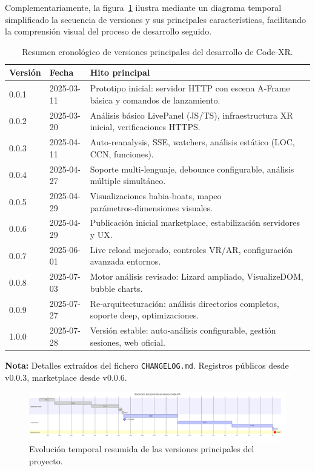 \documentclass[a4paper, 12pt]{book}
\begin{document}
Complementariamente, la figura~\ref{fig:timeline-versions} ilustra mediante un diagrama temporal simplificado la secuencia de versiones y sus principales características, facilitando la comprensión visual del proceso de desarrollo seguido.
\begin{table}[!htbp]
\centering\footnotesize
\begin{tabular}{p{1.8cm} p{2.2cm} p{10.5cm}}
\hline
\textbf{Versión} & \textbf{Fecha} & \textbf{Hito principal} \\
\hline
0.0.1 & 2025-03-11 & Prototipo inicial: servidor HTTP con escena A‑Frame básica y comandos de lanzamiento. \\
0.0.2 & 2025-03-20 & Análisis básico LivePanel (JS/TS), infraestructura XR inicial, verificaciones HTTPS. \\
0.0.3 & 2025-04-11 & Auto‑reanalysis, SSE, watchers, análisis estático (LOC, CCN, funciones). \\
0.0.4 & 2025-04-27 & Soporte multi‑lenguaje, debounce configurable, análisis múltiple simultáneo. \\
0.0.5 & 2025-04-29 & Visualizaciones babia‑boats, mapeo parámetros‑dimensiones visuales. \\
0.0.6 & 2025-04-29 & Publicación inicial marketplace, estabilización servidores y UX. \\
0.0.7 & 2025-06-01 & Live reload mejorado, controles VR/AR, configuración avanzada entornos. \\
0.0.8 & 2025-07-03 & Motor análisis revisado: Lizard ampliado, VisualizeDOM, bubble charts. \\
0.0.9 & 2025-07-27 & Re‑arquitecturación: análisis directorios completos, soporte deep, optimizaciones. \\
1.0.0 & 2025-07-28 & Versión estable: auto‑análisis configurable, gestión sesiones, web oficial. \\
\hline
\end{tabular}
\caption{Resumen cronológico de versiones principales del desarrollo de Code-XR.}
\label{tab:changelog}
\end{table}


\noindent \textbf{Nota:} Detalles extraídos del fichero \texttt{CHANGELOG.md}. Registros públicos desde v0.0.3, marketplace desde v0.0.6.


\begin{figure}[H]
  \centering
  \includegraphics[width=\textwidth]{img/versions_gantt.png}
  \caption{Evolución temporal resumida de las versiones principales del proyecto.}
  \label{fig:timeline-versions}
\end{figure}
\end{document}
